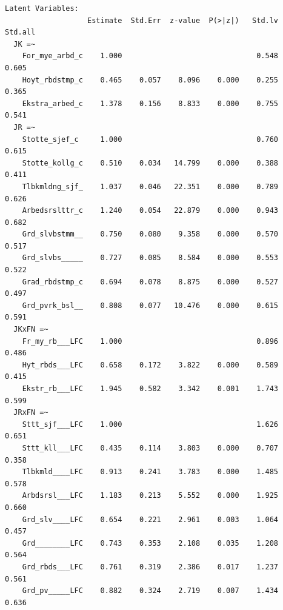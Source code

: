 \documentclass[
  12pt,
  a4paper,
  DIV=11,
  numbers=noendperiod]{scrartcl}
\begin{document}
\begin{verbatim}
Latent Variables:
                   Estimate  Std.Err  z-value  P(>|z|)   Std.lv  Std.all
  JK =~                                                                 
    For_mye_arbd_c    1.000                               0.548    0.605
    Hoyt_rbdstmp_c    0.465    0.057    8.096    0.000    0.255    0.365
    Ekstra_arbed_c    1.378    0.156    8.833    0.000    0.755    0.541
  JR =~                                                                 
    Stotte_sjef_c     1.000                               0.760    0.615
    Stotte_kollg_c    0.510    0.034   14.799    0.000    0.388    0.411
    Tlbkmldng_sjf_    1.037    0.046   22.351    0.000    0.789    0.626
    Arbedsrslttr_c    1.240    0.054   22.879    0.000    0.943    0.682
    Grd_slvbstmm__    0.750    0.080    9.358    0.000    0.570    0.517
    Grd_slvbs_____    0.727    0.085    8.584    0.000    0.553    0.522
    Grad_rbdstmp_c    0.694    0.078    8.875    0.000    0.527    0.497
    Grd_pvrk_bsl__    0.808    0.077   10.476    0.000    0.615    0.591
  JKxFN =~                                                              
    Fr_my_rb___LFC    1.000                               0.896    0.486
    Hyt_rbds___LFC    0.658    0.172    3.822    0.000    0.589    0.415
    Ekstr_rb___LFC    1.945    0.582    3.342    0.001    1.743    0.599
  JRxFN =~                                                              
    Sttt_sjf___LFC    1.000                               1.626    0.651
    Sttt_kll___LFC    0.435    0.114    3.803    0.000    0.707    0.358
    Tlbkmld____LFC    0.913    0.241    3.783    0.000    1.485    0.578
    Arbdsrsl___LFC    1.183    0.213    5.552    0.000    1.925    0.660
    Grd_slv____LFC    0.654    0.221    2.961    0.003    1.064    0.457
    Grd________LFC    0.743    0.353    2.108    0.035    1.208    0.564
    Grd_rbds___LFC    0.761    0.319    2.386    0.017    1.237    0.561
    Grd_pv_____LFC    0.882    0.324    2.719    0.007    1.434    0.636


\end{verbatim}
\end{document}
